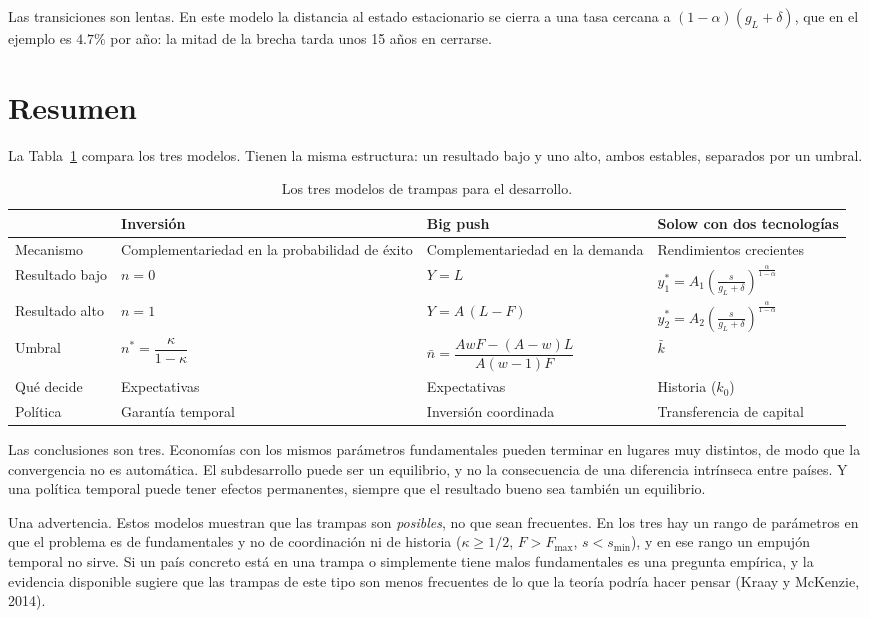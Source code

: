 \documentclass[12pt,letterpaper]{article}
\begin{document}
Las transiciones son lentas. En este modelo la distancia al estado estacionario se cierra a una tasa cercana a $(1-\alpha)(g_L+\delta)$, que en el ejemplo es $4.7\%$ por año: la mitad de la brecha tarda unos 15 años en cerrarse.

\section{Resumen}

La Tabla~\ref{tab:resumen} compara los tres modelos. Tienen la misma estructura: un resultado bajo y uno alto, ambos estables, separados por un umbral.

\begin{table}[htb]
\centering
\small
\renewcommand{\arraystretch}{1.35}
\begin{tabular}{@{}p{2.3cm}p{4.0cm}p{4.0cm}p{4.2cm}@{}}
\toprule
 & Inversión & Big push & Solow con dos tecnologías \\
\midrule
Mecanismo & Complementariedad en la probabilidad de éxito & Complementariedad en la demanda & Rendimientos crecientes \\
Resultado bajo & $n=0$ & $Y=L$ & $y_1^*=A_1\left(\frac{s}{g_L+\delta}\right)^{\frac{\alpha}{1-\alpha}}$ \\
Resultado alto & $n=1$ & $Y=A\,(L-F)$ & $y_2^*=A_2\left(\frac{s}{g_L+\delta}\right)^{\frac{\alpha}{1-\alpha}}$ \\
Umbral & $n^*=\dfrac{\kappa}{1-\kappa}$ & $\bar n=\dfrac{AwF-(A-w)L}{A(w-1)F}$ & $\bar k$ \\
Qué decide & Expectativas & Expectativas & Historia ($k_0$) \\
Política & Garantía temporal & Inversión coordinada & Transferencia de capital \\
\bottomrule
\end{tabular}
\caption{Los tres modelos de trampas para el desarrollo.}
\label{tab:resumen}
\end{table}

Las conclusiones son tres. Economías con los mismos parámetros fundamentales pueden terminar en lugares muy distintos, de modo que la convergencia no es automática. El subdesarrollo puede ser un equilibrio, y no la consecuencia de una diferencia intrínseca entre países. Y una política temporal puede tener efectos permanentes, siempre que el resultado bueno sea también un equilibrio.

Una advertencia. Estos modelos muestran que las trampas son \emph{posibles}, no que sean frecuentes. En los tres hay un rango de parámetros en que el problema es de fundamentales y no de coordinación ni de historia ($\kappa\geq1/2$, $F>F_{\max}$, $s<s_{\min}$), y en ese rango un empujón temporal no sirve. Si un país concreto está en una trampa o simplemente tiene malos fundamentales es una pregunta empírica, y la evidencia disponible sugiere que las trampas de este tipo son menos frecuentes de lo que la teoría podría hacer pensar (Kraay y McKenzie, 2014).
\end{document}

